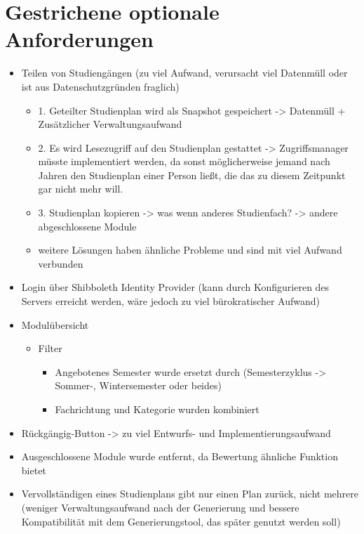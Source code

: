 \section{Gestrichene optionale Anforderungen}
\begin{itemize}
	\item Teilen von Studiengängen (zu viel Aufwand, verursacht viel Datenmüll oder ist aus Datenschutzgründen fraglich)
		\begin{itemize}
			\item 1. Geteilter Studienplan wird als Snapshot gespeichert -> Datenmüll + Zusätzlicher Verwaltungsaufwand
			\item 2. Es wird Lesezugriff auf den Studienplan gestattet -> Zugriffsmanager müsste implementiert werden, da sonst möglicherweise jemand nach Jahren den Studienplan einer Person ließt, die das zu diesem Zeitpunkt gar nicht mehr will.
			\item 3. Studienplan kopieren -> was wenn anderes Studienfach? -> andere abgeschlossene Module
			\item weitere Lösungen haben ähnliche Probleme und sind mit viel Aufwand verbunden
		\end{itemize}	
	\item Login über Shibboleth Identity Provider (kann durch Konfigurieren des Servers erreicht werden, wäre jedoch zu viel bürokratischer Aufwand)
	\item Modulübersicht
		\begin{itemize}
			\item Filter
				\begin{itemize}
					\item Angebotenes Semester wurde ersetzt durch (Semesterzyklus -> Sommer-, Wintersemester oder beides)
					\item Fachrichtung und Kategorie wurden kombiniert
				\end{itemize}
		\end{itemize}
	\item Rückgängig-Button -> zu viel Entwurfs- und Implementierungsaufwand
	\item Ausgeschlossene Module wurde entfernt, da Bewertung ähnliche Funktion bietet
	\item Vervollständigen eines Studienplans gibt nur einen Plan zurück, nicht mehrere (weniger Verwaltungsaufwand nach der Generierung und bessere Kompatibilität mit dem Generierungstool, das später genutzt werden soll)
\end{itemize}